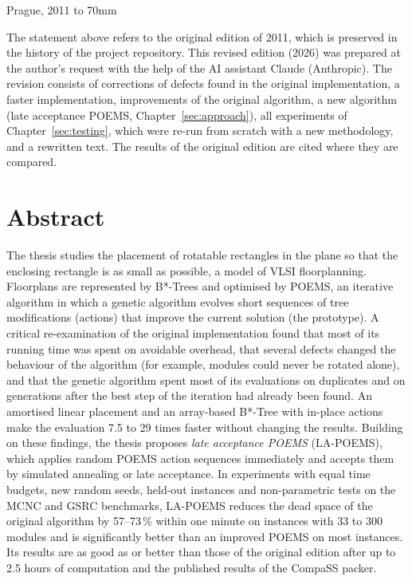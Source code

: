 \documentclass[11pt,twoside,a4paper]{book}
\begin{document}
\bigskip

\noindent
Prague, 2011 \hfill \hbox to 70mm{\tiny\dotfill}

\bigskip

{\small {} The statement above refers to the original edition of 2011, which is preserved in the history of the project repository. This revised edition (2026) was prepared at the author's request with the help of the AI assistant Claude (Anthropic). The revision consists of corrections of defects found in the original implementation, a faster implementation, improvements of the original algorithm, a new algorithm (late acceptance POEMS, Chapter~\ref{sec:approach}), all experiments of Chapter~\ref{sec:testing}, which were re-run from scratch with a new methodology, and a rewritten text. The results of the original edition are cited where they are compared.}


\cleardoublepage
\vspace*{\fill}

\section*{Abstract}

The thesis studies the placement of rotatable rectangles in the plane so that the enclosing rectangle is as small as possible, a model of VLSI floorplanning. Floorplans are represented by B*-Trees and optimised by POEMS, an iterative algorithm in which a genetic algorithm evolves short sequences of tree modifications (actions) that improve the current solution (the prototype). A critical re-examination of the original implementation found that most of its running time was spent on avoidable overhead, that several defects changed the behaviour of the algorithm (for example, modules could never be rotated alone), and that the genetic algorithm spent most of its evaluations on duplicates and on generations after the best step of the iteration had already been found. An amortised linear placement and an array-based B*-Tree with in-place actions make the evaluation 7.5 to 29 times faster without changing the results. Building on these findings, the thesis proposes {\em late acceptance POEMS} (LA-POEMS), which applies random POEMS action sequences immediately and accepts them by simulated annealing or late acceptance. In experiments with equal time budgets, new random seeds, held-out instances and non-parametric tests on the MCNC and GSRC benchmarks, LA-POEMS reduces the dead space of the original algorithm by 57--73\,\% within one minute on instances with 33 to 300 modules and is significantly better than an improved POEMS on most instances. Its results are as good as or better than those of the original edition after up to 2.5 hours of computation and the published results of the CompaSS packer.
\end{document}
